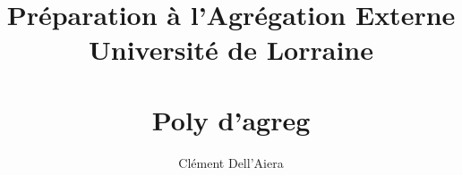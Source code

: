 \documentclass[a4paper]{article}
\title{Préparation à l'Agrégation Externe  \\ Université de Lorraine \\ ~ \\
\textbf{Poly d'agreg}}
\date{} %
\author{ Clément Dell'Aiera }
\begin{document}
  
\maketitle
\tableofcontents

\newpage


\newpage 


\newpage


\newpage






\nocite{*}
\end{document}
